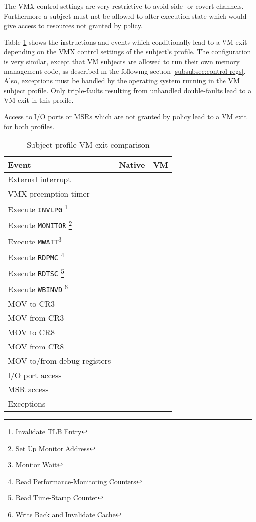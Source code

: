 The VMX control settings are very restrictive to avoid side- or covert-channels.
Furthermore a subject must not be allowed to alter execution state which would
give access to resources not granted by policy.

Table \ref{tab:profiles-cond-vm-exits} shows the instructions and events which
conditionally lead to a VM exit depending on the VMX control settings of the
subject's profile. The configuration is very similar, except that VM subjects
are allowed to run their own memory management code, as described in the
following section \ref{subsubsec:control-regs}. Also, exceptions must be handled
by the operating system running in the VM subject profile. Only triple-faults
resulting from unhandled double-faults lead to a VM exit in this profile.

Access to I/O ports or MSRs which are not granted by policy lead to a
VM exit for both profiles.

\begin{table}[h]
	\centering
	\begin{minipage}[c]{8cm}
	\begin{tabular}{l|c|c}
		\textbf{Event} & \textbf{Native} & \textbf{VM} \\
		\hline
		External interrupt   & \checkmark & \checkmark  \\
		VMX preemption timer & \checkmark & \checkmark  \\
		Execute \texttt{INVLPG}
		\footnote{Invalidate TLB Entry}
		& \checkmark & \checkmark \\
		Execute \texttt{MONITOR}
		\footnote{Set Up Monitor Address}
		& \checkmark & \checkmark \\
		Execute \texttt{MWAIT}\footnote{Monitor Wait}
		& \checkmark & \checkmark \\
		Execute \texttt{RDPMC}
		\footnote{Read Performance-Monitoring Counters}
		& \checkmark & \checkmark \\
		Execute \texttt{RDTSC}
		\footnote{Read Time-Stamp Counter}
		& \checkmark & \checkmark \\
		Execute \texttt{WBINVD}
		\footnote{Write Back and Invalidate Cache}
		& \checkmark & \checkmark \\
		MOV to CR3                  & \checkmark & \\
		MOV from CR3                & \checkmark & \\
		MOV to CR8                  & \checkmark & \checkmark \\
		MOV from CR8                & \checkmark & \checkmark \\
		MOV to/from debug registers & \checkmark & \checkmark \\
		\hline
		I/O port access & \checkmark & \checkmark \\
		MSR access      & \checkmark & \checkmark \\
		Exceptions      & \checkmark & \\
	\end{tabular}
	\end{minipage}
	\caption{Subject profile VM exit comparison}
	\label{tab:profiles-cond-vm-exits}
\end{table}


